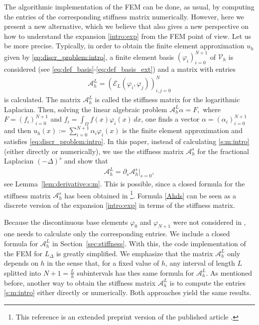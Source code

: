 \documentclass[11 pt]{article}
\numberwithin{equation}{section}
\def\cE{\mathcal{E}}
\begin{document}
 The algorithmic implementation of the FEM can be done, as usual, by computing the entries of the corresponding stiffness matrix numerically. However, here we present a new alternative, which we believe that also gives a new perspective on how to understand the expansion \eqref{intro:exp} from the FEM point of view. Let us be more precise. Typically, in order to obtain the finite element approximation $u_h$ given by \eqref{eq:discr_problem:intro}, a finite element basis $(\varphi_i)_{i=0}^{N+1}$ of $\mathcal V_h$ is considered (see \eqref{eq:def_basis}-\eqref{eq:def_basis_ext}) and a matrix with entries
 \begin{align}\label{s:m:intro}
 \mathcal A_{h}^{L}=(\cE_L(\varphi_i,\varphi_j))_{i,j=0}^N
 \end{align}
 is calculated.  The matrix $\mathcal A_{h}^{L}$ is called the stiffness matrix for the logarithmic Laplacian.  Then, solving the linear algebraic problem $\mathcal A_{h}^{L}\alpha = F,$  where $F=(f_i)_{i=0}^{N+1}$ and $f_i=\int_{\Omega}f(x)\varphi_i(x)\, dx$, one finds a vector $\alpha=(\alpha_i)_{i=0}^{N+1}$ and then $u_h(x):=\sum_{i=0}^{N+1}\alpha_i \varphi_i(x)$  is the finite element approximation and satisfies \eqref{eq:discr_problem:intro}. In this paper, instead of calculating \eqref{s:m:intro} (either directly or numerically), we use the stiffness matrix $\mathcal A_{h}^{s}$ for the fractional Laplacian $(-\Delta)^s$ and show that
 \begin{align}\label{Ahds}
 \mathcal A_{h}^{L}=\partial_s \mathcal A_{h}^{s}|_{s=0},
 \end{align}
 see Lemma~\ref{lem:derivative:s:m}.  This is possible, since a closed formula for the stiffness matrix $\mathcal A_{h}^{s}$ has been obtained in \cite{BH17}\footnote{This reference is an extended preprint version of the published article \cite{BHS19}.}.  Formula \eqref{Ahds} can be seen as a discrete version of the expansion \eqref{intro:exp} in terms of the stiffness matrix.
 
 Because the discontinuous base elements $\varphi_0$ and $\varphi_{N+1}$ were not considered in \cite{BH17}, one needs to calculate only the corresponding entries.  We include a closed formula for $\mathcal A_{h}^{L}$ in Section~\ref{sec:stiffness}.  With this, the code implementation of the FEM for $L_\Delta$ is greatly simplified. We emphasize that the matrix $\mathcal A_{h}^{L}$ only depends on $h$ in the sense that, for a fixed value of $h$, any interval of length $L$ splitted into $N+1=\frac{L}{h}$ subintervals has thes same formula for $\mathcal A_{h}^{L}$. As mentioned before, another way to obtain the stiffness matrix $\mathcal A_{h}^{L}$ is to compute the entries \eqref{s:m:intro} either directly or numerically. Both approaches yield the same results.
\end{document}
